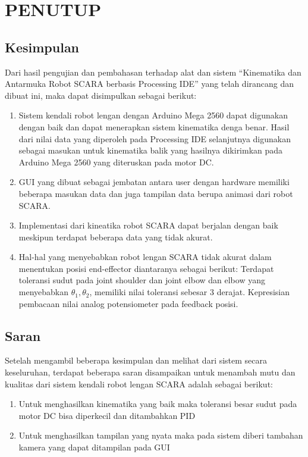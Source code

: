 
\chapter{PENUTUP}
\section{Kesimpulan}
Dari hasil pengujian dan pembahasan terhadap alat dan sistem “Kinematika dan Antarmuka Robot SCARA berbasis Processing IDE” yang telah dirancang dan dibuat ini, maka dapat disimpulkan sebagai berikut:
\begin{enumerate}
	\item Sistem kendali robot lengan dengan Arduino Mega 2560 dapat digunakan dengan baik dan dapat menerapkan sistem kinematika denga benar. Hasil dari nilai data yang diperoleh pada Processing IDE selanjutnya digunakan sebagai masukan untuk kinematika balik yang hasilnya dikirimkan pada Arduino Mega 2560 yang diteruskan pada motor DC.
	\item GUI yang dibuat sebagai jembatan antara user dengan hardware memiliki beberapa masukan data dan juga tampilan data berupa animasi dari robot SCARA.
	\item Implementasi dari kineatika robot SCARA dapat berjalan dengan baik meskipun terdapat beberapa data yang tidak akurat. 
	\item  Hal-hal yang menyebabkan robot lengan SCARA  tidak akurat dalam menentukan posisi end-effector diantaranya sebagai berikut:
	\subitem   Terdapat toleransi sudut pada joint shoulder dan joint elbow dan elbow yang menyebabkan $\theta_{1}, \theta_{2}$, memiliki nilai toleransi sebesar 3 derajat. 
	\subitem  Kepresisian  pembacaan nilai analog potensiometer pada feedback posisi. 
\end{enumerate}
\section{Saran}
Setelah mengambil beberapa kesimpulan dan melihat dari sistem secara keseluruhan, terdapat beberapa saran disampaikan untuk menambah mutu dan kualitas dari sistem kendali robot lengan SCARA adalah sebagai berikut: 
\begin{enumerate}
	\item Untuk menghasilkan kinematika yang baik maka toleransi besar sudut pada motor DC bisa diperkecil dan ditambahkan PID
	\item Untuk menghasilkan tampilan yang nyata maka pada sistem diberi tambahan kamera yang dapat ditampilan pada GUI
\end{enumerate}